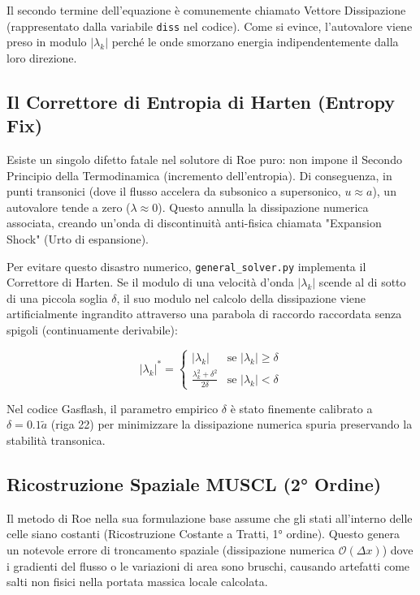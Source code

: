 \documentclass[11pt,a4paper]{article}
\begin{document}
Il secondo termine dell'equazione è comunemente chiamato Vettore Dissipazione (rappresentato dalla variabile \texttt{diss} nel codice). Come si evince, l'autovalore viene preso in modulo $|\lambda_k|$ perché le onde smorzano energia indipendentemente dalla loro direzione.

\subsection{Il Correttore di Entropia di Harten (Entropy Fix)}
Esiste un singolo difetto fatale nel solutore di Roe puro: non impone il Secondo Principio della Termodinamica (incremento dell'entropia). Di conseguenza, in punti transonici (dove il flusso accelera da subsonico a supersonico, $u \approx a$), un autovalore tende a zero ($\lambda \approx 0$). Questo annulla la dissipazione numerica associata, creando un'onda di discontinuità anti-fisica chiamata "Expansion Shock" (Urto di espansione).

Per evitare questo disastro numerico, \texttt{general\_solver.py} implementa il Correttore di Harten. Se il modulo di una velocità d'onda $|\lambda_k|$ scende al di sotto di una piccola soglia $\delta$, il suo modulo nel calcolo della dissipazione viene artificialmente ingrandito attraverso una parabola di raccordo raccordata senza spigoli (continuamente derivabile):

\begin{equation}
|\lambda_k|^* = 
\begin{cases} 
|\lambda_k| & \text{se } |\lambda_k| \geq \delta \\
\frac{\lambda_k^2 + \delta^2}{2\delta} & \text{se } |\lambda_k| < \delta 
\end{cases}
\end{equation}

Nel codice Gasflash, il parametro empirico $\delta$ è stato finemente calibrato a $\delta = 0.1 \tilde{a}$ (riga 22) per minimizzare la dissipazione numerica spuria preservando la stabilità transonica.

\subsection{Ricostruzione Spaziale MUSCL (2° Ordine)}
Il metodo di Roe nella sua formulazione base assume che gli stati all'interno delle celle siano costanti (Ricostruzione Costante a Tratti, 1° ordine). Questo genera un notevole errore di troncamento spaziale (dissipazione numerica $\mathcal{O}(\Delta x)$) dove i gradienti del flusso o le variazioni di area sono bruschi, causando artefatti come salti non fisici nella portata massica locale calcolata.
\end{document}
